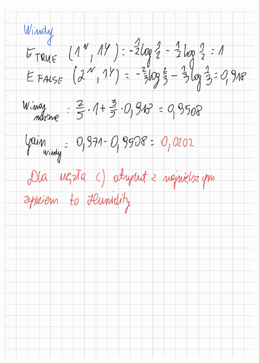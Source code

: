 \documentclass{article}
\begin{document}
\begin{figure}[H]
    \centering
    \includegraphics[width=\textwidth]{tree7.jpg}
\end{figure}
\end{document}
